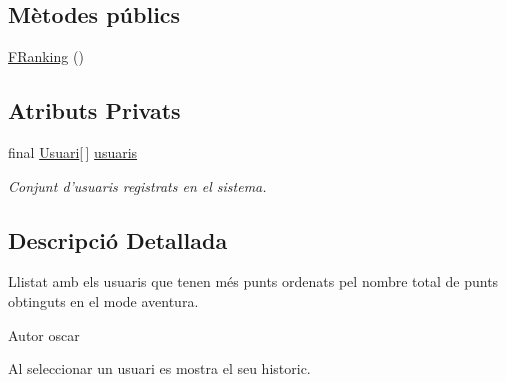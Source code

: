 \subsection*{Mètodes públics}
\begin{DoxyCompactItemize}
\item 
\hyperlink{classinterficie_1_1_f_ranking_a3b8b7cb7f1745c2ebbffe033df573c57}{F\+Ranking} ()
\end{DoxyCompactItemize}
\subsection*{Atributs Privats}
\begin{DoxyCompactItemize}
\item 
\hypertarget{classinterficie_1_1_f_ranking_a09dc89316e366fa4fe26bf19dcd5d692}{final \hyperlink{classlogica_1_1_usuari}{Usuari}\mbox{[}$\,$\mbox{]} \hyperlink{classinterficie_1_1_f_ranking_a09dc89316e366fa4fe26bf19dcd5d692}{usuaris}}\label{classinterficie_1_1_f_ranking_a09dc89316e366fa4fe26bf19dcd5d692}

\begin{DoxyCompactList}\small\item\em Conjunt d'usuaris registrats en el sistema. \end{DoxyCompactList}\end{DoxyCompactItemize}


\subsection{Descripció Detallada}
Llistat amb els usuaris que tenen més punts ordenats pel nombre total de punts obtinguts en el mode aventura. 

\begin{DoxyAuthor}{Autor}
oscar
\end{DoxyAuthor}
Al seleccionar un usuari es mostra el seu historic. 

